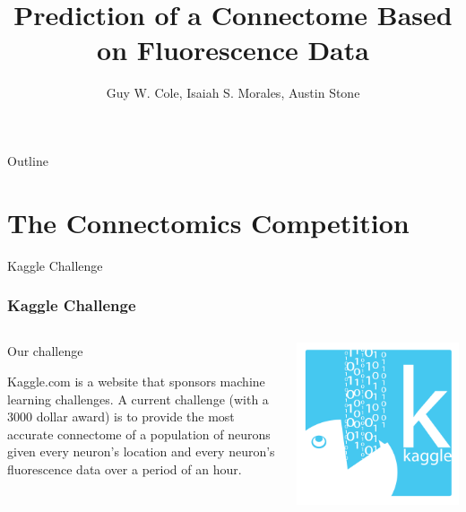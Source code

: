 \documentclass{beamer}
\title[Short Paper Title] %
{Prediction of a Connectome Based on Fluorescence Data}
\author %
{Guy W. Cole, Isaiah S. Morales, Austin Stone}
\begin{document}
\begin{frame}
  \titlepage
\end{frame}

\begin{frame}{Outline}
  \tableofcontents
\end{frame}

\section{The Connectomics Competition}

\begin{frame}{Kaggle Challenge}
\frametitle{Kaggle Challenge}
  \begin{columns}[T]
    \begin{column}{.5\textwidth}
     \begin{block}{Our challenge}


Kaggle.com is a website that sponsors machine learning challenges. A current challenge (with a 3000 dollar award) is to provide the most accurate connectome of a population of neurons given every neuron's location and every neuron's fluorescence data over a period of an hour.

    \end{block}
    \end{column}
    \begin{column}{.5\textwidth}
    \begin{block}{}
    \includegraphics[width=\textwidth]{kaggle-monster.png}
    \end{block}
    \end{column}
  \end{columns}

\end{frame}
\end{document}
